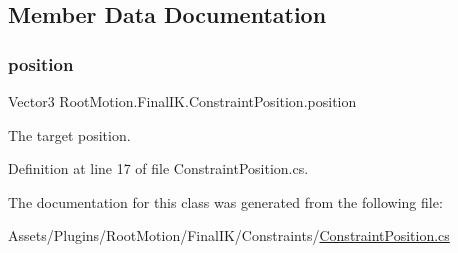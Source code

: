 \subsection{Member Data Documentation}
\mbox{\label{class_root_motion_1_1_final_i_k_1_1_constraint_position_a151c5322ba3a4de83eb5cfe334db93f0}} 
\subsubsection{\texorpdfstring{position}{position}}
{\footnotesize\ttfamily Vector3 Root\+Motion.\+Final\+I\+K.\+Constraint\+Position.\+position}



The target position. 



Definition at line 17 of file Constraint\+Position.\+cs.



The documentation for this class was generated from the following file\+:\begin{DoxyCompactItemize}
\item 
Assets/\+Plugins/\+Root\+Motion/\+Final\+I\+K/\+Constraints/\mbox{\hyperlink{_constraint_position_8cs}{Constraint\+Position.\+cs}}\end{DoxyCompactItemize}
